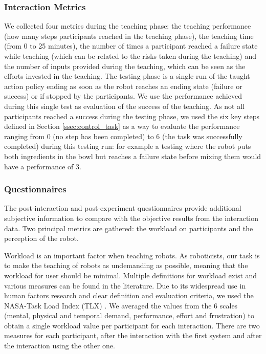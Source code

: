 \subsubsection{Interaction Metrics}

We collected four metrics during the teaching phase: the teaching performance (how many steps participants reached in the teaching phase), the teaching time (from 0 to 25 minutes), the number of times a participant reached a failure state while teaching (which can be related to the risks taken during the teaching) and the number of inputs provided during the teaching, which can be seen as the efforts invested in the teaching. The testing phase is a single run of the taught action policy ending as soon as the robot reaches an ending state (failure or success) or if stopped by the participants. We use the performance achieved during this single test as evaluation of the success of the teaching. As not all participants reached a success during the testing phase, we used the six key steps defined in Section \ref{ssec:control_task} as a way to evaluate the performance ranging from 0 (no step has been completed) to 6 (the task was successfully completed) during this testing run: for example a testing where the robot puts both ingredients in the bowl but reaches a failure state before mixing them would have a performance of 3.

\subsubsection{Questionnaires}

The post-interaction and post-experiment questionnaires provide additional subjective information to compare with the objective results from the interaction data. Two principal metrics are gathered: the workload on participants and the perception of the robot. 

Workload is an important factor when teaching robots. As roboticists, our task is to make the teaching of robots as undemanding as possible, meaning that the workload for user should be minimal. Multiple definitions for workload exist and various measures can be found in the literature. Due to its widespread use in human factors research and clear definition and evaluation criteria, we used the NASA-Task Load Index (TLX) \citep{hart1988development}. We averaged the values from the 6 scales (mental, physical and temporal demand, performance, effort and frustration) to obtain a single workload value per participant for each interaction. There are two measures for each participant, after the interaction with the first system and after the interaction using the other one.

